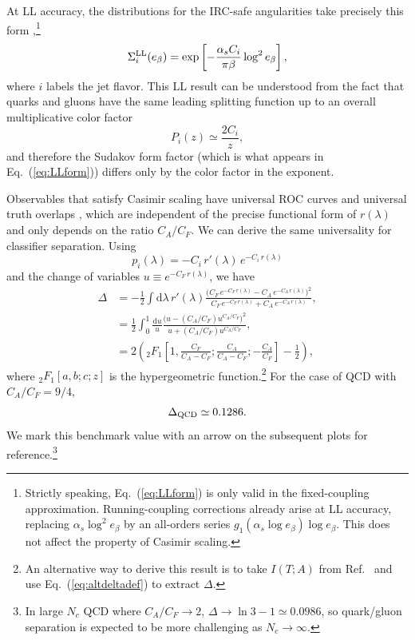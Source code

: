 \documentclass[11pt,letterpaper]{article}
\newcommand{\df}{\text{d}}
\DeclareRobustCommand{\Eq}[1]{Eq.~(\ref{#1})}
\DeclareRobustCommand{\Ref}[1]{Ref.~\cite{#1}}
\newcommand{\be}{\begin{equation}}
\newcommand{\ee}{\end{equation}}
\begin{document}
At LL accuracy, the distributions for the IRC-safe angularities take
precisely this form
\cite{Larkoski:2013eya,Larkoski:2014pca},\footnote{Strictly speaking,
  \Eq{eq:LLform} is only valid in the fixed-coupling
  approximation. Running-coupling corrections already arise at
   LL accuracy, replacing $\alpha_s\log^2e_\beta$ by an all-orders
  series $g_1(\alpha_s\log e_\beta)\log e_\beta$. This does not
  affect the property of Casimir scaling.}
\be
\label{eq:LLform}
\Sigma_i^{\rm LL}(e_\beta) = \exp \left[ - \frac{\alpha_s C_i}{\pi \beta} \log^2 e_\beta  \right],
\ee
where $i$ labels the jet flavor.  This LL result can be understood from the fact that quarks and gluons have the same leading splitting function up to an overall multiplicative color factor
\be
\label{eq:splitting_function_Casimir}
P_i(z) \simeq \frac{2 C_i}{z},
\ee
and therefore the Sudakov form factor (which is what appears in \Eq{eq:LLform}) differs only by the color factor in the exponent.

Observables that satisfy Casimir scaling have universal ROC curves \cite{Larkoski:2013eya} and universal truth overlaps \cite{Larkoski:2014pca}, which are independent of the precise functional form of $r(\lambda)$ and only depends on the ratio $C_A/C_F$.  We can derive the same universality for classifier separation.  Using
\be
p_i(\lambda) = - C_i \, r'(\lambda) \, e^{-C_i \, r(\lambda)}
\ee
and the change of variables $u \equiv e^{-C_F \, r(\lambda)}$, we have
\begin{align}
\Delta &=  -\frac{1}{2} \int \df \lambda \, r'(\lambda) \frac{\bigl(C_F \, e^{-C_F \, r(\lambda)} - C_A \, e^{-C_A \, r(\lambda)}\bigr)^2}{C_F\,  e^{-C_F\,  r(\lambda)}+ C_A \, e^{-C_A \, r(\lambda)}} , \\
& = \frac{1}{2} \int_0^1 \frac{\df u}{u} \frac{\bigl(u - (C_A / C_F) u^{C_A/C_F}\bigr)^2}{u + (C_A/C_F) u^{C_A/C_F}} , \\
& = 2 \left({}_2F_1\left[1,\frac{C_F}{C_A - C_F}; \frac{C_A}{C_A - C_F}; - \frac{C_A}{C_F}\right] - \frac{1}{2}  \right),
\end{align}
where ${}_2F_1[a,b;c;z]$ is the hypergeometric function.\footnote{An alternative way to derive this result is to take $I(T;A)$ from \Ref{Larkoski:2014pca} and use \Eq{eq:altdeltadef} to extract $\Delta$.}  For the case of QCD with $C_A/C_F = 9/4$,
\be
\label{eq:LLbenchmark}
\Delta_{\rm QCD} \simeq  0.1286.
\ee
We mark this benchmark value with an arrow on the subsequent plots for reference.\footnote{In large $N_c$ QCD where $C_A/C_F \to 2$, $\Delta \to \ln 3 - 1 \simeq 0.0986$, so quark/gluon separation is expected to be more challenging as $N_c \to \infty$.} 
\end{document}
